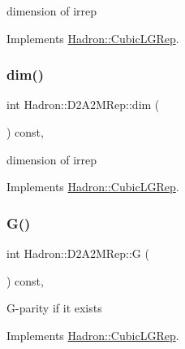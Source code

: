 dimension of irrep 

Implements \mbox{\hyperlink{structHadron_1_1CubicLGRep_a3acbaea26503ed64f20df693a48e4cdd}{Hadron\+::\+Cubic\+L\+G\+Rep}}.

\mbox{\label{structHadron_1_1D2A2MRep_a8c1eee2c61a4d9f6721fe703253d5c26}} 
\subsubsection{\texorpdfstring{dim()}{dim()}\hspace{0.1cm}{\footnotesize\ttfamily [2/2]}}
{\footnotesize\ttfamily int Hadron\+::\+D2\+A2\+M\+Rep\+::dim (\begin{DoxyParamCaption}{ }\end{DoxyParamCaption}) const\hspace{0.3cm}{\ttfamily [inline]}, {\ttfamily [virtual]}}

dimension of irrep 

Implements \mbox{\hyperlink{structHadron_1_1CubicLGRep_a3acbaea26503ed64f20df693a48e4cdd}{Hadron\+::\+Cubic\+L\+G\+Rep}}.

\mbox{\label{structHadron_1_1D2A2MRep_a2596fa94fc03bbceebf051143cfb14ea}} 
\subsubsection{\texorpdfstring{G()}{G()}\hspace{0.1cm}{\footnotesize\ttfamily [1/2]}}
{\footnotesize\ttfamily int Hadron\+::\+D2\+A2\+M\+Rep\+::G (\begin{DoxyParamCaption}{ }\end{DoxyParamCaption}) const\hspace{0.3cm}{\ttfamily [inline]}, {\ttfamily [virtual]}}

G-\/parity if it exists 

Implements \mbox{\hyperlink{structHadron_1_1CubicLGRep_ace26f7b2d55e3a668a14cb9026da5231}{Hadron\+::\+Cubic\+L\+G\+Rep}}.

\mbox{\label{structHadron_1_1D2A2MRep_a2596fa94fc03bbceebf051143cfb14ea}} 
